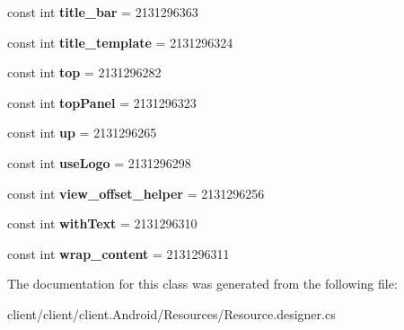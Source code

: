 \begin{DoxyCompactItemize}
\item 
\hypertarget{classClient_1_1Droid_1_1Resource_1_1Id_a249be6d73935a9aebd86989ad31b12ed}{}const int {\bfseries title\+\_\+bar} = 2131296363\label{classClient_1_1Droid_1_1Resource_1_1Id_a249be6d73935a9aebd86989ad31b12ed}

\item 
\hypertarget{classClient_1_1Droid_1_1Resource_1_1Id_a5c8d2a799773f37e4800722f87461ba3}{}const int {\bfseries title\+\_\+template} = 2131296324\label{classClient_1_1Droid_1_1Resource_1_1Id_a5c8d2a799773f37e4800722f87461ba3}

\item 
\hypertarget{classClient_1_1Droid_1_1Resource_1_1Id_a4c49e443d00e046bb82987a7d78ea1c0}{}const int {\bfseries top} = 2131296282\label{classClient_1_1Droid_1_1Resource_1_1Id_a4c49e443d00e046bb82987a7d78ea1c0}

\item 
\hypertarget{classClient_1_1Droid_1_1Resource_1_1Id_a4bbd4d5793c00cfbc45c9028713880e0}{}const int {\bfseries top\+Panel} = 2131296323\label{classClient_1_1Droid_1_1Resource_1_1Id_a4bbd4d5793c00cfbc45c9028713880e0}

\item 
\hypertarget{classClient_1_1Droid_1_1Resource_1_1Id_a5021dccd3aa6c8745dc91d1b38b2a67c}{}const int {\bfseries up} = 2131296265\label{classClient_1_1Droid_1_1Resource_1_1Id_a5021dccd3aa6c8745dc91d1b38b2a67c}

\item 
\hypertarget{classClient_1_1Droid_1_1Resource_1_1Id_aff043a46b073c4210f4a11f65c282825}{}const int {\bfseries use\+Logo} = 2131296298\label{classClient_1_1Droid_1_1Resource_1_1Id_aff043a46b073c4210f4a11f65c282825}

\item 
\hypertarget{classClient_1_1Droid_1_1Resource_1_1Id_aed41aa7d4055d74cadb32d25c220e5b4}{}const int {\bfseries view\+\_\+offset\+\_\+helper} = 2131296256\label{classClient_1_1Droid_1_1Resource_1_1Id_aed41aa7d4055d74cadb32d25c220e5b4}

\item 
\hypertarget{classClient_1_1Droid_1_1Resource_1_1Id_a99ade32f39885b9b26f27d77d7abbf3e}{}const int {\bfseries with\+Text} = 2131296310\label{classClient_1_1Droid_1_1Resource_1_1Id_a99ade32f39885b9b26f27d77d7abbf3e}

\item 
\hypertarget{classClient_1_1Droid_1_1Resource_1_1Id_a82c1ea23ff9fcabcfcd18ffc05a81f02}{}const int {\bfseries wrap\+\_\+content} = 2131296311\label{classClient_1_1Droid_1_1Resource_1_1Id_a82c1ea23ff9fcabcfcd18ffc05a81f02}

\end{DoxyCompactItemize}


The documentation for this class was generated from the following file\+:\begin{DoxyCompactItemize}
\item 
client/client/client.\+Android/\+Resources/Resource.\+designer.\+cs\end{DoxyCompactItemize}
